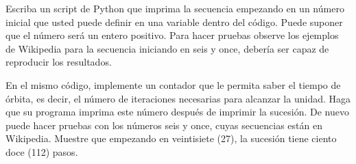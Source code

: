\documentclass[11pt,letterpaper]{exam}
\begin{document}
\begin{questions}
 

Escriba un script de Python que imprima la secuencia empezando en un n\'umero inicial que usted puede definir en una variable dentro del c\'odigo. Puede suponer que el n\'umero ser\'a un entero positivo. Para hacer pruebas observe los ejemplos de Wikipedia para la secuencia iniciando en seis y once, deber\'ia ser capaz de reproducir los resultados.


En el mismo c\'odigo, implemente un contador que le permita saber el tiempo de \'orbita, es decir, el n\'umero de iteraciones necesarias para alcanzar la unidad. Haga que su programa imprima este n\'umero despu\'es de imprimir la sucesi\'on. De nuevo puede hacer pruebas con los n\'umeros seis y once, cuyas secuencias est\'an en Wikipedia. Muestre que empezando en veintisiete (27), la sucesi\'on tiene ciento doce (112) pasos. 


\end{questions}
\end{document}
